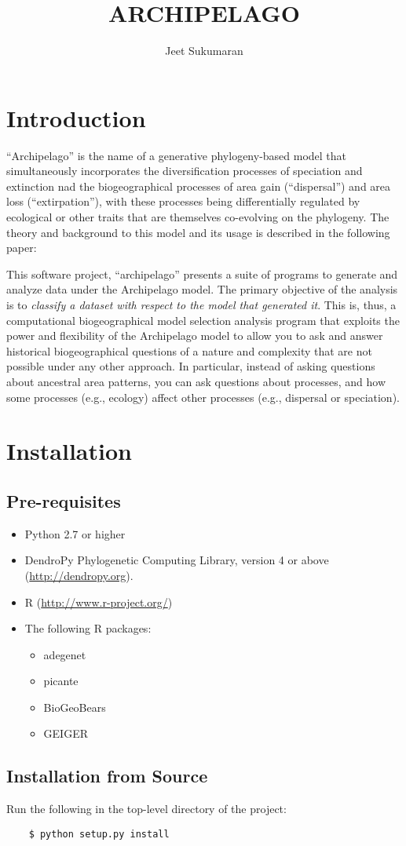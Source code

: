 \documentclass[11pt]{article}
\begin{document}

\title{ARCHIPELAGO}
\author{Jeet Sukumaran}
\maketitle

\section{Introduction}

``Archipelago'' is the name of a generative phylogeny-based model that simultaneously incorporates the diversification processes of speciation and extinction nad the biogeographical processes of area gain (``dispersal'') and area loss (``extirpation''), with these processes being differentially regulated by ecological or other traits that are themselves co-evolving on the phylogeny.
The theory and background to this model and its usage is described in the following paper:


This software project, ``archipelago'' presents a suite of programs to generate and analyze data under the Archipelago model.
The primary objective of the analysis is to \textit{classify a dataset with respect to the model that generated it}.
This is, thus, a computational biogeographical model selection analysis program that exploits the power and flexibility of the Archipelago model to allow you to ask and answer historical biogeographical questions of a nature and complexity that are not possible under any other approach.
In particular, instead of asking questions about ancestral area patterns, you can ask questions about processes, and how some processes (e.g., ecology) affect other processes (e.g., dispersal or speciation).

\section{Installation}

\subsection{Pre-requisites}

\begin{itemize}
    \item Python 2.7 or higher
    \item DendroPy Phylogenetic Computing Library, version 4 or above (\url{http://dendropy.org}).
    \item R (\url{http://www.r-project.org/})
    \item The following R packages:
    \begin{itemize}
        \item adegenet
        \item picante
        \item BioGeoBears
        \item GEIGER
    \end{itemize}
\end{itemize}

\subsection{Installation from Source}

Run the following in the top-level directory of the project:

\begin{lstlisting}
    $ python setup.py install
\end{lstlisting}
\end{document}

